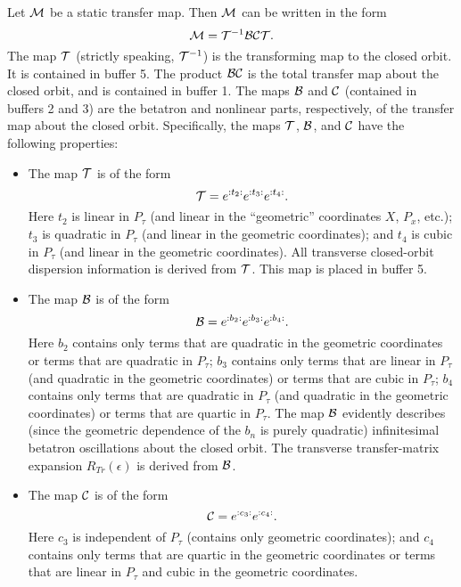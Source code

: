      Let ${\cal M}$ be a static transfer map. Then ${\cal M}$ can be written in the form
\begin{equation}
{\cal M}= {\cal T}^{-1}{\cal BCT}.
\end{equation}
The map ${\cal T}$ (strictly speaking, ${\cal T}^{-1}$) is the transforming map to the closed
orbit. It is contained in buffer 5.  The product ${\cal BC}$ is the total transfer
map about the closed orbit, and is contained in buffer 1.  The maps ${\cal B}$ and ${\cal C}$
(contained in buffers 2 and 3) are the betatron and nonlinear parts, respectively, of the transfer map about the closed orbit.  Specifically, the
maps ${\cal T}$, ${\cal B}$, and ${\cal C}$ have the following properties:
\begin{itemize}
\item  The map ${\cal T}$ is of the form
\begin{equation}
{\cal T}= e^{:t_2:} e^{:t_3:} e^{:t_4:}.
\end{equation}
Here $t_2$  is linear in $P_\tau$  (and linear in the ``geometric''
coordinates $X$,
      $P_x$, etc.); $t_3$  is quadratic in $P_\tau$  (and linear in the geometric
      coordinates); and $t_4$  is cubic in $P_\tau$  (and linear in the geometric
      coordinates).  All transverse closed-orbit  dispersion information is derived
	  from ${\cal T}$.  This map is placed in buffer 5.

\item  The map ${\cal B}$ is of the form
\begin{equation}
{\cal B}= e^{:b_2:} e^{:b_3:} e^{:b_4:}.
\end{equation}
      Here $b_2$ contains only terms that are quadratic in the geometric
      coordinates or terms that are quadratic in $P_\tau$; $b_3$  contains only terms
      that are linear in $P_\tau$  (and quadratic in the geometric coordinates) or
      terms that are cubic in $P_\tau$; $b_4$  contains only terms that are quadratic
      in $P_\tau$  (and quadratic in the geometric coordinates) or terms that are
      quartic in $P_\tau$.  The map ${\cal B}$ evidently describes (since the geometric
      dependence of the $b_n$ is purely quadratic) infinitesimal betatron
      oscillations about the closed orbit.  The transverse
	  transfer-matrix expansion $R_{Tr}(\epsilon )$ is derived from ${\cal B}$.

\item  The map ${\cal C}$ is of the form
\begin{equation}
{\cal C}=  e^{:c_3:} e^{:c_4:}.
\end{equation}
      Here $c_3$  is independent of $P_\tau$  (contains only geometric coordinates);
      and $c_4$  contains only terms that are quartic in the geometric coordinates or
      terms that are linear in $P_\tau$  and cubic in the geometric
      coordinates.
\end{itemize}
